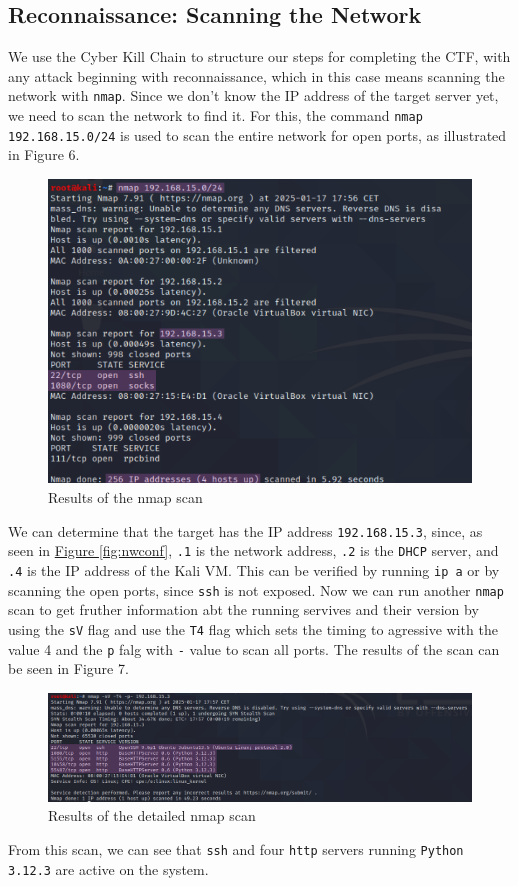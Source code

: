 \documentclass[a4paper]{article}
\newcommand{\abc}{\hfill \break}
\begin{document}
\subsection{Reconnaissance: Scanning the Network}
We use the Cyber Kill Chain to structure our steps for completing the CTF, with any attack beginning with reconnaissance, which in this case means scanning the network with \texttt{nmap}. Since we don't know the IP address of the target server yet, we need to scan the network to find it. For this, the command \texttt{nmap 192.168.15.0/24} is used to scan the entire network for open ports, as illustrated in Figure 6.\cite{cyberkillchain}
\begin{figure}[ht]
	\includegraphics[scale=0.4]{images/firstnmapscan.png}
	\centering
	\caption{Results of the nmap scan}
\end{figure}\abc
We can determine that the target has the IP address \texttt{192.168.15.3}, since, as seen in \textcolor{blue}{\hyperref[fig:nwconf]{Figure \ref{fig:nwconf}}}, \texttt{.1} is the network address, \texttt{.2} is the \texttt{DHCP} server, and \texttt{.4} is the IP address of the Kali VM. This can be verified by running \texttt{ip a} or by scanning the open ports, since \texttt{ssh} is not exposed.
Now we can run another \texttt{nmap} scan to get fruther information abt the running servives and their version by using the \texttt{sV} flag and use the \texttt{T4} flag which sets the timing to agressive with the value 4 and the \texttt{p} falg with \texttt{-} value to scan all ports. The results of the scan can be seen in Figure 7.\cite{nmap-sv,nmap-t-flag}
\begin{figure}[h]
	\includegraphics[scale=0.4]{images/nmapfr.png}
	\centering
	\caption{Results of the detailed nmap scan}
\end{figure}\abc
From this scan, we can see that \texttt{ssh} and four \texttt{http} servers running \texttt{Python 3.12.3} are active on the system.
\end{document}
